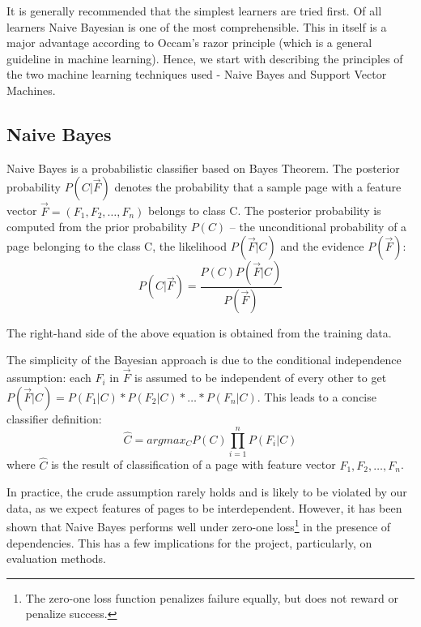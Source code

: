 \documentclass[12pt,a4paper,notitlepage,twoside]{scrbook}
\begin{document}
It is generally recommended that the simplest learners are tried
first\cite{domingos}. Of all learners Naive Bayesian is one of the most
comprehensible. This in itself is a major advantage according to Occam's razor
principle (which is a general guideline in machine learning).
Hence, we start with describing the principles of the two machine learning
techniques used - Naive Bayes and Support Vector Machines.

\subsection{Naive Bayes}
\label{prep:nb}
Naive Bayes is a probabilistic classifier based on Bayes Theorem. The
posterior probability \(P(C|\vec{F})\) denotes the probability that a sample
page with a feature vector \(\vec{F}=(F_1,F_2,\dots,F_n)\) belongs to class C.
The posterior probability is computed from the prior
probability \(P(C)\) -- the unconditional probability of a page belonging to
the class C, the likelihood \(P(\vec{F}|C)\) and the evidence \(P(\vec{F})\):
\begin{equation}
P(C|\vec{F}) = \frac{P(C)P(\vec{F}|C)}{P(\vec{F})}
\end{equation}

The right-hand side of the above equation is obtained from the training data.

The simplicity of the Bayesian approach is due to the conditional independence
assumption: each \(F_i\) in \(\vec{F}\) is assumed to be independent of every other
to get \(P(\vec{F}|C)=P(F_1|C)*P(F_2|C)*\dots*P(F_n|C)\). This leads to a concise classifier definition:
\begin{equation}
\hat{C}= argmax_C P(C)\prod_{i=1}^{n}P(F_i|C)
\end{equation}
where \(\hat{C}\) is the result of classification of a page with feature vector
\(F_1,F_2,\dots,F_n\).

In practice, the crude assumption rarely  holds and is likely to be violated by our data,
as we expect features of pages to be interdependent.  However, it has been shown that
Naive Bayes performs well under zero-one loss\footnote{The zero-one loss function
	penalizes failure equally, but does not reward or penalize success.} in the
	presence of dependencies\cite{OPTIM}. This has a few implications for the project,
	particularly, on evaluation methods.
\end{document}
